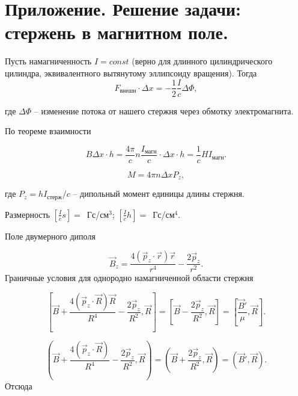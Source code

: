 \section{Приложение. Решение задачи: стержень в магнитном поле.}

Пусть намагниченность $I = const$ (верно для длинного цилиндрического цилиндра, эквивалентного вытянутому эллипсоиду вращения).
Тогда
\begin{equation*}
	F_{\text{внешн}} \cdot \Delta x = - \frac{1}{2} \frac{I}{c} \Delta \Phi,
\end{equation*}

где $\Delta \Phi$ -- изменение потока от нашего стержня через обмотку электромагнита.

По теореме взаимности

\begin{equation*}
	B\Delta x \cdot h = \frac{4\pi}{c} n \frac{I_{\text{магн}}}{c} \cdot \Delta x \cdot h = \frac{1}{c}HI_{\text{магн}}.
\end{equation*}

\begin{equation*}
	M = 4\pi n \Delta x P_z,
\end{equation*}

где $P_z = h I_{\text{стерж}}/c$ -- дипольный момент единицы длины стержня.

Размерность $\left[ \frac{I}{c}s \right] =$~Гс/см$^3$; $\left[ \frac{I}{c}h \right] =$~Гс/см$^4$.

Поле двумерного диполя

\begin{equation*}
	\vec B_z = \frac{4(\vec p_z \cdot \vec r) \vec r}{r^4} - \frac{2\vec p_z}{r^2}.
\end{equation*}
Граничные условия для однородно намагниченной области стержня

\begin{equation*}
	\left[ \vec B + \frac{4(\vec p_z \cdot \vec R) \vec R}{R^4} - \frac{2\vec p_z}{R^2}, \vec R \right] = \left[ \vec B - \frac{2\vec p_z}{R^2}, \vec R \right] = \left[ \frac{\vec B'}{\mu}, \vec R \right].
\end{equation*}

\begin{equation*}
	\left( \vec B + \frac{4(\vec p_z \cdot \vec R)}{R^4} - \frac{2\vec p_z}{R^2}, \vec R \right) = \left( \vec B + \frac{2\vec p_z}{R^2}, \vec R \right) = \left( \vec B', \vec R \right).
\end{equation*}
Отсюда

